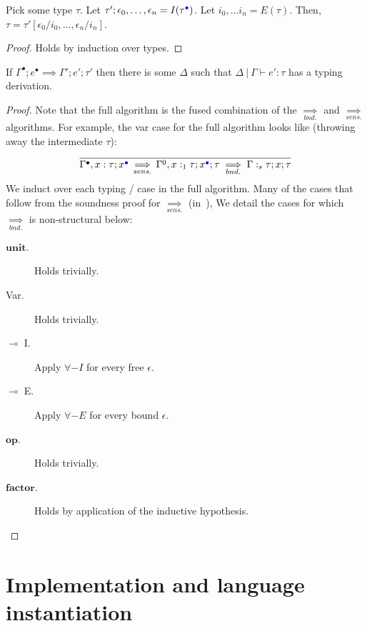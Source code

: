 \begin{lemma}
Pick some type $\tau$.
Let $\tau'; \epsilon_0, \ldots, \epsilon_n = I(\tau^{\textcolor{blue}{\bullet}})$.
Let $i_0, \ldots i_n = E(\tau)$.
Then, $\tau = \tau'[\epsilon_0 / i_0, \ldots, \epsilon_n / i_n]$.
\end{lemma}
\begin{proof}
Holds by induction over types.
\end{proof}

\begin{theorem} \label{thm:algo-soundness}
If $\Gamma^{\bullet}; e^{\bullet} \implies \Gamma'; e'; \tau'$ then there is some
$\Delta$ such that $\Delta \ | \ \Gamma \vdash e' : \tau$ has a typing derivation.
\end{theorem}
\begin{proof}
Note that the full algorithm is the fused combination of the
$\underset{bnd.}{\implies}$ and $\underset{sens.}{\implies}$ algorithms. For
example, the var case for the full algorithm looks like (throwing away the
intermediate $\tau$):
\begin{equation}
\frac
{}
{\Gamma^{\bullet}, x : \tau; x^{\textcolor{blue}{\bullet}} \underset{sens.}{\implies}
\Gamma^0, x :_1 \tau; x^{\textcolor{blue}{\bullet}}; \tau \underset{bnd.}{\implies} \Gamma
:_s \tau; x; \tau}
\end{equation}
We induct over each typing / case in the full algorithm. Many of the cases that
follow from the soundness proof for $\underset{sens.}{\implies}$
(in~\cite{NumFuzz}), We detail the cases for which $\underset{bnd.}{\implies}$
is non-structural below:
\begin{description}
  \item[$\textbf{unit}$.] Holds trivially.
  \item[Var.] Holds trivially.
  \item[$\multimap$ I.] Apply $\forall-I$ for every free $\epsilon$.
  \item[$\multimap$ E.] Apply $\forall-E$ for every bound $\epsilon$.
  \item[$\textbf{op}$.] Holds trivially.
  \item[$\textbf{factor}$.] Holds by application of the inductive hypothesis.
\end{description}
\end{proof}

\section{Implementation and language instantiation}
